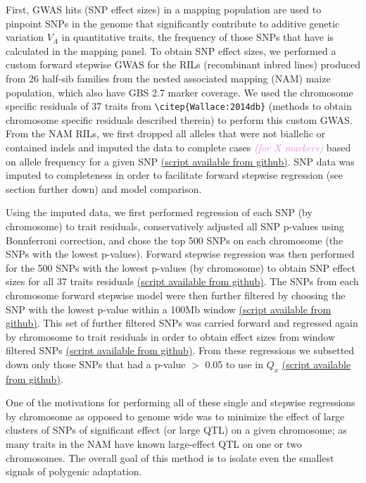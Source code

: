 \documentclass[9pt,twocolumn,twoside]{gsajnl}
\newcommand{\kc}[1]{\textcolor{violet}{ \emph{ #1}} }
\begin{document}
First, GWAS hits (SNP effect sizes) in a mapping population are used to pinpoint SNPs in the genome that significantly contribute to additive genetic variation $V_A$ in quantitative traits, the frequency of those SNPs that have is calculated in the mapping panel. 
To obtain SNP effect sizes, we performed a custom forward stepwise GWAS for the RILs (recombinant inbred lines) produced from 26 half-sib families from the nested associated mapping (NAM) maize population, which also have GBS 2.7 marker coverage.
We used the chromosome specific residuals of 37 traits from \verb|\citep{Wallace:2014db}| (methods to obtain chromosome specific residuals described therein) to perform this custom GWAS. 
From the NAM RILs, we first dropped all alleles that were not biallelic or contained indels and imputed the data to complete cases \kc{(for X markers)} based on allele frequency for a given SNP \href{https://github.com/RILAB/historical_genomics/blob/master/scripts/bulk_imputation_script1.R}{(script available from github)}. 
SNP data was imputed to completeness in order to facilitate forward stepwise regression (see section further down) and model comparison.  

Using the imputed data, we first performed regression of each SNP (by chromosome) to trait residuals, conservatively adjusted all SNP p-values using Bonnferroni correction, and chose the top 500 SNPs on each chromosome (the SNPs with the lowest p-values). 
Forward stepwise regression was then performed for the 500 SNPs with the lowest p-values (by chromosome) to obtain SNP effect sizes for all 37 traits residuals \href{https://github.com/RILAB/historical_genomics/blob/master/scripts/single_step_NAM_script_2.R}{(script available from github)}. 
The SNPs from each chromosome forward stepwise model were then further filtered by choosing the SNP with the lowest p-value within a 100Mb window \href{https://github.com/RILAB/historical_genomics/blob/master/scripts/filter_snp_effects_script_3.R}{(script available from github)}. 
This set of further filtered SNPs was carried forward and regressed again by chromosome to trait residuals in order to obtain effect sizes from window filtered SNPs \href{https://github.com/RILAB/historical_genomics/blob/master/scripts/final_effects_script_4.R}{(script available from github)}. 
From these regressions we subsetted down only those SNPs that had a p-value $>$ 0.05 to use in $Q_x$ \href{https://github.com/RILAB/historical_genomics/blob/master/scripts/script5.R}{(script available from github)}.

One of the motivations for performing all of these single and stepwise regressions by chromosome as opposed to genome wide was to minimize the effect of large clusters of SNPs of significant effect (or large QTL) on a given chromosome; as many traits in the NAM have known large-effect QTL on one or two chromosomes. The overall goal of this method is to isolate even the smallest signals of polygenic adaptation. 
\end{document}
